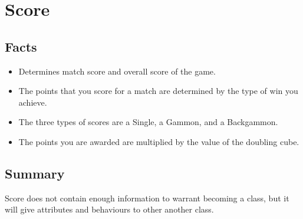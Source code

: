 \section{Score}

\subsection{Facts}

\begin{itemize} [itemsep=2pt,parsep=2pt]
    \item Determines match score and overall score of the game.
    \item The points that you score for a match are determined by the type of win you achieve.
    \item The three types of scores are a Single, a Gammon, and a Backgammon.
    \item The points you are awarded are multiplied by the value of the doubling cube.
\end{itemize}


\subsection{Summary}
Score does not contain enough information to warrant becoming a class, but it will give attributes and behaviours to other another class.

